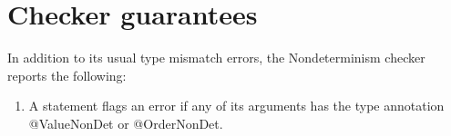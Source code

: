 \section{Checker guarantees\label{error-reporting}}
In addition to its usual type mismatch errors, the Nondeterminism checker reports the following:
\begin{enumerate}
	\item A  statement flags an error if any of its arguments has the type annotation @ValueNonDet or @OrderNonDet.
\end{enumerate}


